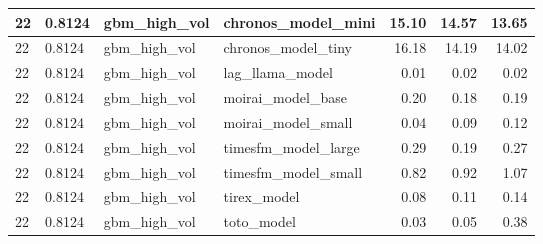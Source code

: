 {\begin{tabular}{llllrrr}
\midrule
22 & 0.8124 & gbm\_high\_vol & chronos\_model\_mini & 15.10 & 14.57 & 13.65 \\
\midrule
22 & 0.8124 & gbm\_high\_vol & chronos\_model\_tiny & 16.18 & 14.19 & 14.02 \\
\midrule
22 & 0.8124 & gbm\_high\_vol & lag\_llama\_model & 0.01 & 0.02 & 0.02 \\
\midrule
22 & 0.8124 & gbm\_high\_vol & moirai\_model\_base & 0.20 & 0.18 & 0.19 \\
\midrule
22 & 0.8124 & gbm\_high\_vol & moirai\_model\_small & 0.04 & 0.09 & 0.12 \\
\midrule
22 & 0.8124 & gbm\_high\_vol & timesfm\_model\_large & 0.29 & 0.19 & 0.27 \\
\midrule
22 & 0.8124 & gbm\_high\_vol & timesfm\_model\_small & 0.82 & 0.92 & 1.07 \\
\midrule
22 & 0.8124 & gbm\_high\_vol & tirex\_model & 0.08 & 0.11 & 0.14 \\
\midrule
22 & 0.8124 & gbm\_high\_vol & toto\_model & 0.03 & 0.05 & 0.38 \\
\bottomrule
\end{tabular}
}